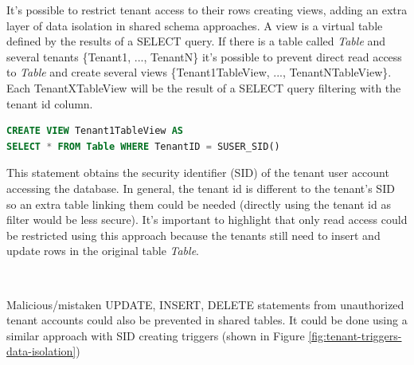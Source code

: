 \documentclass[11pt,english]{article} %
\begin{document}
It's possible to restrict tenant access to their rows creating views, adding an extra layer of data isolation in shared schema approaches.
A view is a virtual table defined by the results of a SELECT query.
If there is a table called \textit{Table} and several tenants \{Tenant1, ..., TenantN\} it's possible to prevent direct read access to \textit{Table} and create several views \{Tenant1TableView, ..., TenantNTableView\}.
Each TenantXTableView will be the result of a SELECT query filtering with the tenant id column.

\begin{lstlisting}[language=sql,numbers=none]
CREATE VIEW Tenant1TableView AS
SELECT * FROM Table WHERE TenantID = SUSER_SID()
\end{lstlisting}

This statement obtains the security identifier (SID) of the tenant user account accessing the database.
In general, the tenant id is different to the tenant's SID so an extra table linking them could be needed (directly using the tenant id as filter would be less secure).
It's important to highlight that only read access could be restricted using this approach because the tenants still need to insert and update rows in the original table \textit{Table}.

\ 

Malicious/mistaken UPDATE, INSERT, DELETE statements from unauthorized tenant accounts could also be prevented in shared tables. It could be done using a similar approach with SID creating triggers (shown in Figure \ref{fig:tenant-triggers-data-isolation})
\end{document}
